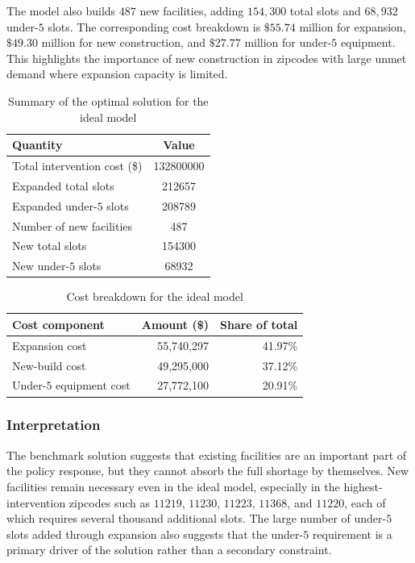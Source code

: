 \documentclass[11pt]{article}
\newcommand{\1}{\mathbb{I}}
\begin{document}
The model also builds \(487\) new facilities, adding \(154{,}300\) total slots and \(68{,}932\) under-\(5\) slots. The corresponding cost breakdown is \(\$55.74\) million for expansion, \(\$49.30\) million for new construction, and \(\$27.77\) million for under-\(5\) equipment. This highlights the importance of new construction in zipcodes with large unmet demand where expansion capacity is limited.

\begin{table}[H]
\centering
\small
\begin{tabular}{lS[table-format=9.0]}
\toprule
\textbf{Quantity} & {\textbf{Value}} \\
\midrule
Total intervention cost (\$) & 132800000 \\
Expanded total slots & 212657 \\
Expanded under-\(5\) slots & 208789 \\
Number of new facilities & 487 \\
New total slots & 154300 \\
New under-\(5\) slots & 68932 \\
\bottomrule
\end{tabular}
\caption{Summary of the optimal solution for the ideal model}
\end{table}

\begin{table}[H]
\centering
\small
\begin{tabular}{lrr}
\toprule
\textbf{Cost component} & \textbf{Amount (\$)} & \textbf{Share of total} \\
\midrule
Expansion cost & 55,740,297 & 41.97\% \\
New-build cost & 49,295,000 & 37.12\% \\
Under-\(5\) equipment cost & 27,772,100 & 20.91\% \\
\bottomrule
\end{tabular}
\caption{Cost breakdown for the ideal model}
\end{table}

\subsubsection{Interpretation}

The benchmark solution suggests that existing facilities are an important part of the policy response, but they cannot absorb the full shortage by themselves. New facilities remain necessary even in the ideal model, especially in the highest-intervention zipcodes such as \(11219\), \(11230\), \(11223\), \(11368\), and \(11220\), each of which requires several thousand additional slots. The large number of under-\(5\) slots added through expansion also suggests that the under-\(5\) requirement is a primary driver of the solution rather than a secondary constraint.
\end{document}
